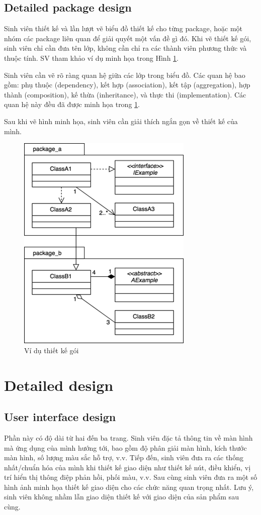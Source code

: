 \documentclass[../main.tex]{subfiles}
\begin{document}
\subsection{Detailed package design}
Sinh viên thiết kế và lần lượt vẽ biểu đồ thiết kế cho từng package, hoặc một nhóm các package liên quan để giải quyết một vấn đề gì đó. Khi vẽ thiết kế gói, sinh viên chỉ cần đưa tên lớp, không cần chỉ ra các thành viên phương thức và thuộc tính. SV tham khảo ví dụ minh họa trong Hình \ref{fig:Fig2}.

Sinh viên cần vẽ rõ ràng quan hệ giữa các lớp trong biểu đồ. Các quan hệ bao gồm: phụ thuộc (dependency), kết hợp (association), kết tập (aggregation), hợp thành (composition), kế thừa (inheritance), và thực thi (implementation). Các quan hệ này đều đã được minh họa trong \ref{fig:Fig2}.

Sau khi vẽ hình minh họa, sinh viên cần giải thích ngắn gọn về thiết kế của mình. 

\begin{figure}[H]
    \centering
    \includegraphics{Figure/Picture2.png}
    \caption{Ví dụ thiết kế gói}
    \label{fig:Fig2}
\end{figure}

\section{Detailed design}
\subsection{User interface design}
Phần này có độ dài từ hai đến ba trang. Sinh viên đặc tả thông tin về màn hình mà ứng dụng của mình hướng tới, bao gồm độ phân giải màn hình, kích thước màn hình, số lượng màu sắc hỗ trợ, v.v. Tiếp đến, sinh viên đưa ra các thống nhất/chuẩn hóa của mình khi thiết kế giao diện như thiết kế nút, điều khiển, vị trí hiển thị thông điệp phản hồi, phối màu, v.v. Sau cùng sinh viên đưa ra một số hình ảnh minh họa thiết kế giao diện cho các chức năng quan trọng nhất. Lưu ý, sinh viên không nhầm lẫn giao diện thiết kế với giao diện của sản phẩm sau cùng.
\end{document}
